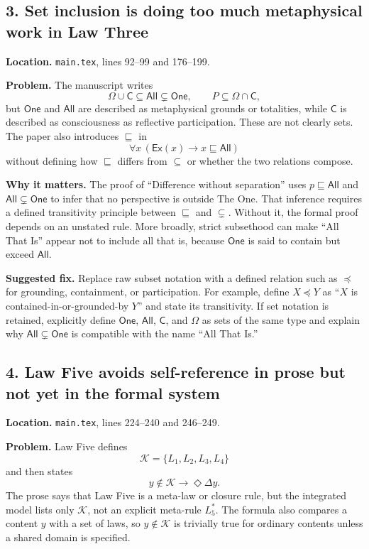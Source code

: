 \documentclass[11pt]{article}
\newcommand{\Ex}{\mathsf{Ex}}
\newcommand{\One}{\mathsf{One}}
\newcommand{\All}{\mathsf{All}}
\newcommand{\Consc}{\mathsf{C}}
\newcommand{\Kernel}{\mathcal{K}}
\begin{document}
\subsection*{3. Set inclusion is doing too much metaphysical work in Law Three}

\textbf{Location.} \texttt{main.tex}, lines 92--99 and 176--199.

\textbf{Problem.} The manuscript writes
\[
\Omega\cup\Consc\subseteq\All\subsetneq\One,
\qquad
P\subseteq\Omega\cap\Consc,
\]
but $\One$ and $\All$ are described as metaphysical grounds or totalities, while $\Consc$ is described as consciousness as reflective participation. These are not clearly sets. The paper also introduces $\sqsubseteq$ in
\[
\forall x\,(\Ex(x)\rightarrow x\sqsubseteq\All)
\]
without defining how $\sqsubseteq$ differs from $\subseteq$ or whether the two relations compose.

\textbf{Why it matters.} The proof of ``Difference without separation'' uses $p\sqsubseteq\All$ and $\All\subsetneq\One$ to infer that no perspective is outside The One. That inference requires a defined transitivity principle between $\sqsubseteq$ and $\subsetneq$. Without it, the formal proof depends on an unstated rule. More broadly, strict subsethood can make ``All That Is'' appear not to include all that is, because $\One$ is said to contain but exceed $\All$.

\textbf{Suggested fix.} Replace raw subset notation with a defined relation such as $\preceq$ for grounding, containment, or participation. For example, define $X\preceq Y$ as ``$X$ is contained-in-or-grounded-by $Y$'' and state its transitivity. If set notation is retained, explicitly define $\One$, $\All$, $\Consc$, and $\Omega$ as sets of the same type and explain why $\All\subsetneq\One$ is compatible with the name ``All That Is.''

\subsection*{4. Law Five avoids self-reference in prose but not yet in the formal system}

\textbf{Location.} \texttt{main.tex}, lines 224--240 and 246--249.

\textbf{Problem.} Law Five defines
\[
\Kernel=\{L_1,L_2,L_3,L_4\}
\]
and then states
\[
y\notin\Kernel\rightarrow\Diamond\Delta y.
\]
The prose says that Law Five is a meta-law or closure rule, but the integrated model lists only $\Kernel$, not an explicit meta-rule $L_5^\ast$. The formula also compares a content $y$ with a set of laws, so $y\notin\Kernel$ is trivially true for ordinary contents unless a shared domain is specified.
\end{document}
